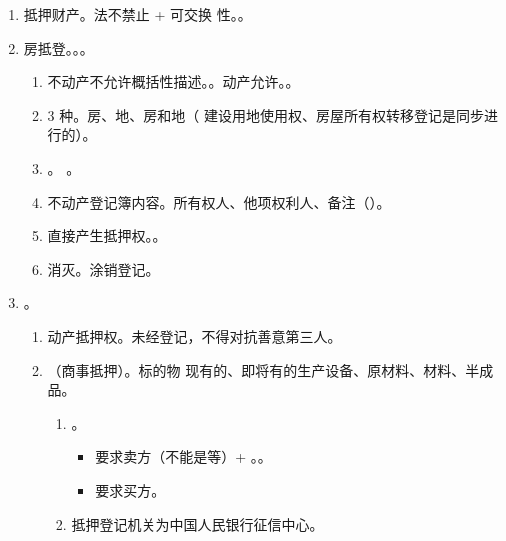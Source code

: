 \begin{enumerate}
        \begin{enumerate}
          \item 抵押财产。法不禁止 + 可交换 性。。
          \item 房抵登。。。
                \begin{enumerate}
                  \item 不动产不允许概括性描述。。动产允许。。
                  \item 3 种。房、地、房和地（ \yjt 建设用地使用权、房屋所有权转移登记是同步进行的）。
                  \item {}。
                        。
                  \item 不动产登记簿内容。所有权人、他项权利人、备注（）。
                  \item {}直接产生抵押权。。
                  \item 消灭。涂销登记。
                \end{enumerate}
          \item {}。
                \begin{enumerate}
                  \item 动产抵押权。未经登记，不得对抗善意第三人。
                  \item {}（商事抵押）。标的物 \yjt 现有的、即将有的生产设备、原材料、材料、半成品。
                        \begin{enumerate}
                          \item {}。
                                \begin{itemize}
                                  \item 要求卖方（不能是等）+ 。。
                                  \item 要求买方。
                                \end{itemize}
                          \item 抵押登记机关为中国人民银行征信中心。

\end{enumerate}
\end{enumerate}
\end{enumerate}
\end{enumerate}
